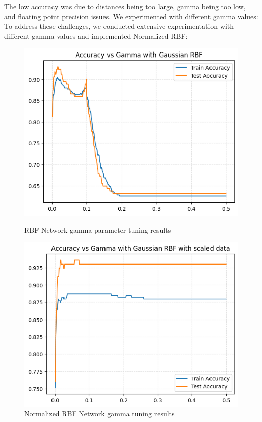 \documentclass[11pt]{article}
\begin{document}
The low accuracy was due to distances being too large, gamma being too low, and floating point precision issues. We experimented with different gamma values:
To address these challenges, we conducted extensive experimentation with different gamma values and implemented Normalized RBF:

\begin{figure}[H]
  \centering
  \begin{minipage}{0.48\textwidth}
    \includegraphics[width=\linewidth]{img/GammaHyperparameterTuning.png}
    \caption{RBF Network gamma parameter tuning results}
  \end{minipage}
  \hfill
  \begin{minipage}{0.48\textwidth}
    \includegraphics[width=\linewidth]{img/NormGammaHyperparameterTuning.png}
    \caption{Normalized RBF Network gamma tuning results}
  \end{minipage}
\end{figure}
\end{document}
